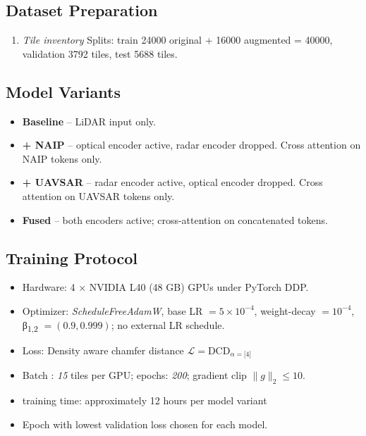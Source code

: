 \documentclass[preprint,12pt,authoryear]{elsarticle}
\begin{document}
\subsection{Dataset Preparation}
\begin{enumerate}[leftmargin=*]
    \item \textit{Tile inventory} Splits: train 24000 original + 16000 augmented = 40000, validation 3792 tiles, test  5688 tiles.
\end{enumerate}

\subsection{Model Variants}
\begin{itemize}[leftmargin=*]
    \item \textbf{Baseline} – LiDAR input only.
    \item \textbf{+ NAIP} – optical encoder active, radar encoder dropped. Cross attention on NAIP tokens only. 
    \item \textbf{+ UAVSAR} – radar encoder active, optical encoder dropped. Cross attention on UAVSAR tokens only. 
    \item \textbf{Fused} – both encoders active; cross-attention on concatenated tokens.
\end{itemize}

\subsection{Training Protocol}
\begin{itemize}[leftmargin=*]
    \item Hardware: 4 × NVIDIA L40 (48 GB) GPUs under PyTorch DDP.
    \item Optimizer: \textit{ScheduleFreeAdamW}\cite{defazio_road_2024}, base LR $=5\!\times\!10^{-4}$, weight-decay $=10^{-4}$, β\textsubscript{1,2} $=(0.9,0.999)$; no external LR schedule.
    \item Loss: Density aware chamfer distance \citep{wu_density-aware_2021}  $\mathcal{L} = \text{DCD}_{\alpha=\text{[4]}}$
    \item Batch : \textit{15} tiles per GPU; epochs: \textit{200}; gradient clip $\lVert g\rVert_2 \le 10$.
    \item training time: approximately 12 hours per model variant
    \item Epoch with lowest validation loss chosen for each model.

\end{itemize}
\end{document}
